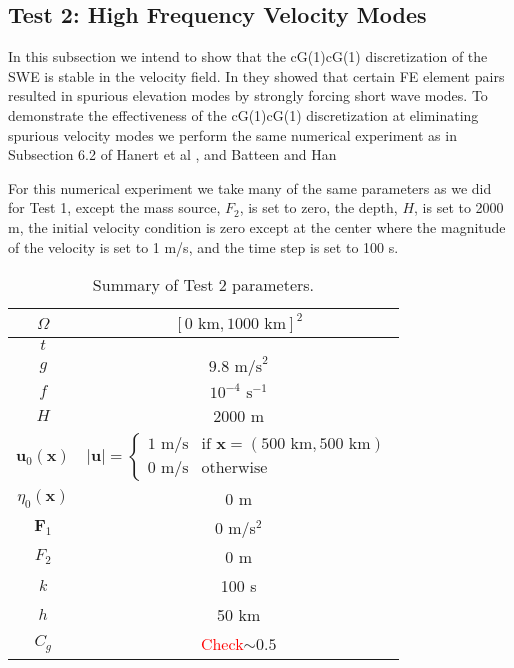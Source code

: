 \subsection{Test 2: High Frequency Velocity Modes}
  In this subsection we intend to show that the cG(1)cG(1) discretization of the
  SWE is stable in the velocity field. In \cite{Hanert2002} they showed that
  certain FE element pairs resulted in spurious elevation modes by strongly
  forcing short wave modes.  To demonstrate the effectiveness of the cG(1)cG(1)
  discretization at eliminating spurious velocity modes we perform the same
  numerical experiment as in Subsection 6.2 of Hanert et al \cite{Hanert2002},
  and Batteen and Han \cite{Batteen1981}

  For this numerical experiment we take many of the same parameters as we did
  for Test 1, except the mass source, $F_2$, is set to zero, the depth, $H$, is
  set to 2000 m, the initial velocity condition is zero except at the center
  where the magnitude of the velocity is set to 1 m/s, and the time step is set
  to 100 s.
  \def\arraystretch{1.25} %
  \begin{table}[H]
    \begin{center}
      \begin{tabular}{|c|c|}
        \hline
        $\Omega$ & $[0\text{ km}, 1000\text{ km}]^2$ \\ \hline
        $t$ &  \\ \hline
        $g$ & $9.8\text{ m/s}^2$ \\ \hline 
        $f$ & $10^{-4}\text{ s}^{-1}$ \\ \hline
        $H$ & 2000 m \\ \hline
        $\mathbf{u}_0(\mathbf{x})$ & 
          $\left|\mathbf{u}\right| = 
            \begin{cases}
              1\text{ m/s} & \text{if }\mathbf{x}=(500\text{ km}, 500\text{ km}) \\ 
              0\text{ m/s} & \text{otherwise}
            \end{cases}$ \\ \hline
          $\eta_0(\mathbf{x})$ & 0 m \\ \hline
        $\mathbf{F}_1$ & 0 m/s$^2$\\ \hline
        $F_2$ & 0 m\\ \hline
        $k$ & 100 s \\ \hline
        $h$ & 50 km \\ \hline
        $C_g$ & \textcolor{red}{Check}$\sim 0.5$ \\ \hline
      \end{tabular}
      \caption{Summary of Test 2 parameters.}
      \label{tab:HFVelocityParams}
    \end{center}
  \end{table}

